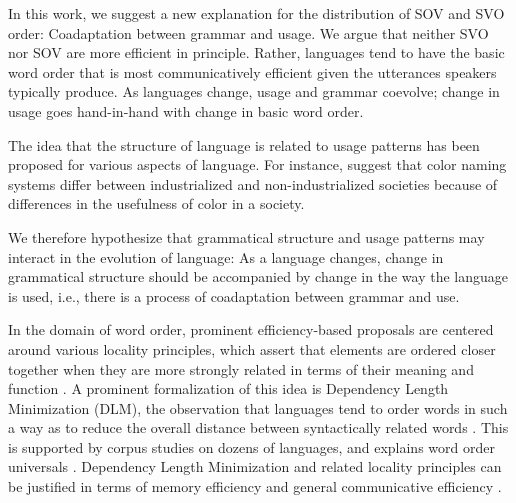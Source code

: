 \documentclass[11pt,a4paper]{article}
\newcommand\comment[1]{{\color{red}#1}}
\begin{document}
In this work, we suggest a new explanation for the distribution of SOV and SVO order:
{Coadaptation} between grammar and usage.
We argue that neither SVO nor SOV are more efficient in principle.
Rather, languages tend to have the basic word order that is most communicatively efficient given the utterances speakers typically produce.
As languages change, usage and grammar coevolve; change in usage goes hand-in-hand with change in basic word order.

The idea that the structure of language is related to usage patterns has been proposed for various aspects of language.
For instance, \cite{gibson2017color} suggest that color naming systems differ between industrialized and non-industrialized societies because of differences in the usefulness of color in a society.


We therefore hypothesize that grammatical structure and usage patterns may interact in the evolution of language:
As a language changes, change in grammatical structure should be accompanied by change in the way the language is used, i.e., there is a process of {coadaptation} between grammar and use.

In the domain of word order, prominent efficiency-based proposals are centered around various locality principles, which assert that elements are ordered closer together when they are more strongly related in terms of their meaning and function \citep{behaghel1932deutsche,givon1985iconicity,rijkhoff-word-1986,hawkins-performance-1994}.
A prominent formalization of this idea is {Dependency Length Minimization} (DLM), the observation that languages tend to order words in such a way as to reduce the overall distance between syntactically related words \citep{rijkhoff-word-1986,hawkins-performance-1994,futrell-cross-linguistic-2015, liu-dependency-2017}.
This is supported by corpus studies on dozens of languages, and explains word order universals \citep{rijkhoff-word-1986, hawkins-performance-1994, hahn2020universals}.
Dependency Length Minimization and related locality principles can be justified in terms of memory efficiency \citep{gibson-linguistic-1998} and general communicative efficiency \citep{hahn2020universals}.
\end{document}
